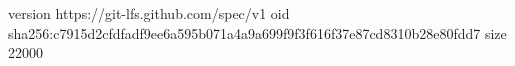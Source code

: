 version https://git-lfs.github.com/spec/v1
oid sha256:c7915d2cfdfadf9ee6a595b071a4a9a699f9f3f616f37e87cd8310b28e80fdd7
size 22000
